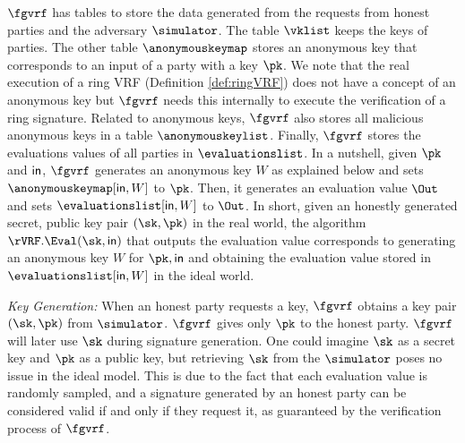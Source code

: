 $ \fgvrf $ has tables to store the data generated from the requests from honest parties and the adversary $ \simulator $. The table $ \vklist $  keeps the keys of parties. The other table  $ \anonymouskeymap $ stores an anonymous key that corresponds to an input  of a party with a key $ \pk $. We note that the real execution of a ring VRF (Definition \ref{def:ringVRF}) does not have a concept of an anonymous key but $ \fgvrf $ needs this internally to execute the verification of a ring signature. Related to anonymous keys, $ \fgvrf $ also stores  all  malicious anonymous keys in a table $ \anonymouskeylist $. Finally, $ \fgvrf $ stores the evaluations values of all parties in $ \evaluationslist $. In a nutshell,  given $ \pk $
and $ \mathsf{in} $, $ \fgvrf $  generates an anonymous key $ W $ as explained below and  sets $ \anonymouskeymap[\msg,W]  $ to $ \pk $. Then, it generates an evaluation value $ \Out $ and sets $ \evaluationslist[\msg,W]  $ to $ \Out $. In short, given an honestly generated secret, public key pair $ (\sk,\pk) $ in the real world, the algorithm
$ \rVRF.\Eval(\sk,\msg) $  that outputs the evaluation value corresponds to generating an anonymous key $ W $ for $ \pk, \msg $ and obtaining the evaluation value stored in $ \evaluationslist[\msg,W] $ in the ideal world. 


\smallskip
	\noindent \textit{Key Generation:}  When an honest party requests  a key, $ \fgvrf $ obtains a key pair $ (\sk, \pk) $ from $ \simulator $. 
	$ \fgvrf $ gives only $ \pk $ to the honest party. $ \fgvrf $ will later use $ \sk $ during signature generation. One could imagine $ \sk $ as a secret key and $ \pk $ as a public key, but retrieving $ \sk $ from the $ \simulator $ poses no issue in the ideal model. This is due to the fact that each evaluation value is randomly sampled, and a signature generated by an honest party can be considered valid if and only if they request it, as guaranteed by the verification process of $\fgvrf$.





